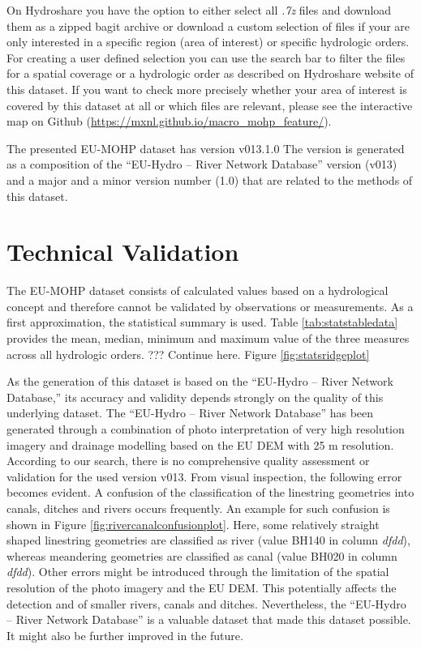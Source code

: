 \documentclass[fleqn,10pt]{wlscirep}
\begin{document}
On Hydroshare you have the option to either select all \emph{.7z} files and download them as a zipped bagit archive or download a custom selection of files if your are only interested in a specific region (area of interest) or specific hydrologic orders. For creating a user defined selection you can use the search bar to filter the files for a spatial coverage or a hydrologic order as described on Hydroshare website of this dataset. If you want to check more precisely whether your area of interest is covered by this dataset at all or which files are relevant, please see the interactive map on Github
(\url{https://mxnl.github.io/macro_mohp_feature/}).

The presented EU-MOHP dataset\cite{nolscher_eu-mohp_2021-1} has version v013.1.0 The version is generated as a composition of the ``EU-Hydro -- River Network Database''\cite{noauthor_eu-hydro_2021} version (v013) and a major and a minor version number (1.0) that are related to the methods of this dataset.

\hypertarget{technical-validation}{%
\section*{Technical Validation}\label{technical-validation}}

The EU-MOHP dataset\cite{nolscher_eu-mohp_2021-1} consists of calculated values based on a hydrological concept and therefore cannot be validated by observations or measurements. As a first approximation, the statistical summary is used. Table \ref{tab:statstabledata} provides the mean, median, minimum and maximum value of the three measures across all hydrologic orders.
??? Continue here. Figure \ref{fig:statsridgeplot}

As the generation of this dataset is based on the ``EU-Hydro -- River Network Database,'' its accuracy and validity depends strongly on the quality of this underlying dataset. The ``EU-Hydro -- River Network Database''\cite{noauthor_eu-hydro_2021} has been generated through a combination of photo interpretation of very high resolution imagery and drainage modelling based on the EU DEM with 25 m resolution. According to our search, there is no comprehensive quality assessment or validation for the used version v013. From visual inspection, the following error becomes evident. A confusion of the classification of the linestring geometries into canals, ditches and rivers occurs frequently. An example for such confusion is shown in Figure \ref{fig:rivercanalconfusionplot}. Here, some relatively straight shaped linestring geometries are classified as river (value BH140 in column \emph{dfdd}), whereas meandering geometries are classified as canal (value BH020 in column \emph{dfdd}). Other errors might be introduced through the limitation of the spatial resolution of the photo imagery and the EU DEM. This potentially affects the detection and of smaller rivers, canals and ditches. Nevertheless, the ``EU-Hydro -- River Network Database''\cite{noauthor_eu-hydro_2021} is a valuable dataset that made this dataset possible. It might also be further improved in the future.
\end{document}
